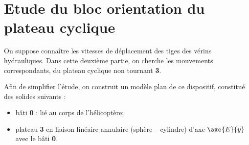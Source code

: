 \section{Etude du bloc orientation du plateau cyclique}
\ifprof
\else
On suppose connaître les vitesses de déplacement des tiges des vérins hydrauliques. Dans cette deuxième partie, on cherche les mouvements correspondants, du plateau cyclique non tournant \textbf{3}. 

%
%

Afin de simplifier l’étude, on construit un modèle plan de ce dispositif, constitué des solides suivants :
\begin{itemize}
\item bâti \textbf{0} : lié au corps de l’hélicoptère;
\item plateau \textbf{3} en liaison linéaire annulaire (sphère -- cylindre) d’axe $\axe{E}{y}$ avec le bâti \textbf{0}.
\end{itemize}

